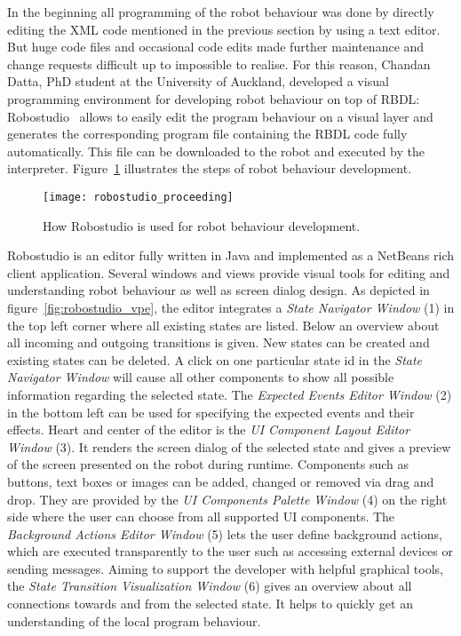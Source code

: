 In the beginning all programming of the robot behaviour was done by directly editing the XML code mentioned in the previous section by using a text editor. But huge code files and occasional code edits made further maintenance and change requests difficult up to impossible to realise. For this reason, Chandan Datta, PhD student at the University of Auckland, developed a visual programming environment for developing robot behaviour on top of RBDL: Robostudio~\cite{robostudio} allows to easily edit the program behaviour on a visual layer and generates the corresponding program file containing the RBDL code fully automatically. This file can be downloaded to the robot and executed by the interpreter. Figure~\ref{fig:robostudio_proceeding} illustrates the steps of robot behaviour development.

\begin{figure}[htbp]
  \centering
  \texttt{[image: robostudio\_proceeding]} 
  \caption{How Robostudio is used for robot behaviour development.}
  \label{fig:robostudio_proceeding}
\end{figure}

Robostudio is an editor fully written in Java and implemented as a NetBeans rich client application.
Several windows and views provide visual tools for editing and understanding robot behaviour as well as screen dialog design. As depicted in figure~\ref{fig:robostudio_vpe}, the editor integrates a \emph{State Navigator Window} (1) in the top left corner where all existing states are listed. Below an overview about all incoming and outgoing transitions is given. New states can be created and existing states can be deleted. A click on one particular state id in the \emph{State Navigator Window} will cause all other components to show all possible information regarding the selected state.
The \emph{Expected Events Editor Window} (2) in the bottom left can be used for specifying the expected events and their effects.
Heart and center of the editor is the \emph{UI Component Layout Editor Window} (3). It renders the screen dialog of the selected state and gives a preview of the screen presented on the robot during runtime. Components such as buttons, text boxes or images can be added, changed or removed via drag and drop.
They are provided by the \emph{UI Components Palette Window} (4) on the right side where the user can choose from all supported UI components.
The \emph{Background Actions Editor Window} (5) lets the user define background actions, which are executed transparently to the user such as accessing external devices or sending messages.
Aiming to support the developer with helpful graphical tools, the \emph{State Transition Visualization Window} (6) gives an overview about all connections towards and from the selected state. It helps to quickly get an understanding of the local program behaviour.

